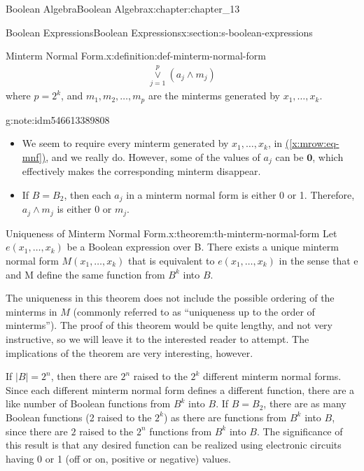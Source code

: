 \documentclass[oneside,10pt,]{book}
\newcommand{\xreffont}{\relax}
\numberwithin{equation}{section}
\begin{document}
\begin{chapterptx}{Boolean Algebra}{}{Boolean Algebra}{}{}{x:chapter:chapter_13}
\begin{sectionptx}{Boolean Expressions}{}{Boolean Expressions}{}{}{x:section:s-boolean-expressions}
\begin{definition}{Minterm Normal Form.}{x:definition:def-minterm-normal-form}
\begin{gather}
\underset{j=1}{\overset{p}{\lor }}\left(a_j\land m_j\right)\label{x:mrow:eq-mnf}
\end{gather}
where \(p=2^k\),  and  \(m_1,m_2, \ldots , m_p\) are the minterms generated by  \(x_1, \ldots, x_k\).%
\end{definition}
\begin{note}{}{g:note:idm546613389808}%
%
\begin{itemize}[label=\textbullet]
\item{}We seem to require every minterm generated by \(x_1, \ldots, x_k\), in \hyperref[x:mrow:eq-mnf]{({\xreffont\ref{x:mrow:eq-mnf}})}, and we really do.  However, some of the values of \(a_j\) can be \(\pmb{0}\), which effectively makes the corresponding minterm disappear.%
\item{}If \(B=B_2\), then each \(a_j\) in a minterm normal form is either 0 or 1. Therefore, \(a_j\land m_j\) is either 0 or \(m_j\).%
\end{itemize}
%
\end{note}
\begin{theorem}{Uniqueness of Minterm Normal Form.}{}{x:theorem:th-minterm-normal-form}%
Let \(e\left(x_1,\ldots , x_k\right)\) be a Boolean expression over B. There exists a unique minterm normal form \(M\left(x_1, \ldots , x_k\right)\) that is equivalent to  \(e\left(x_1, \ldots , x_k\right)\) in the sense that e and M define the same function from \(B^k\) into \(B\).%
\end{theorem}
The uniqueness in this theorem does not include the possible ordering of the minterms in \(M\) (commonly referred to as ``uniqueness up to the order of minterms''). The proof of this theorem would be quite lengthy, and not very instructive, so we will leave it to the interested reader to attempt. The implications of the theorem are very interesting, however.%
\par
If \(\lvert B\rvert =2^n\), then there are \(2^n\) raised to the \(2^k\) different minterm normal forms. Since each different minterm normal form defines a different function, there are a like number of Boolean functions from \(B^k\) into \(B\).  If \(B=B_2\), there are as many Boolean functions (2 raised to the \(2^k\)) as there are functions from \(B^k\) into \(B\), since there are \(2\) raised to the \(2^{n}\) functions from \(B^k\) into \(B\).  The significance of this result is that any desired function can be realized using electronic circuits having 0 or 1 (off or on, positive or negative) values.%
\par

\end{sectionptx}
\end{chapterptx}
\end{document}
